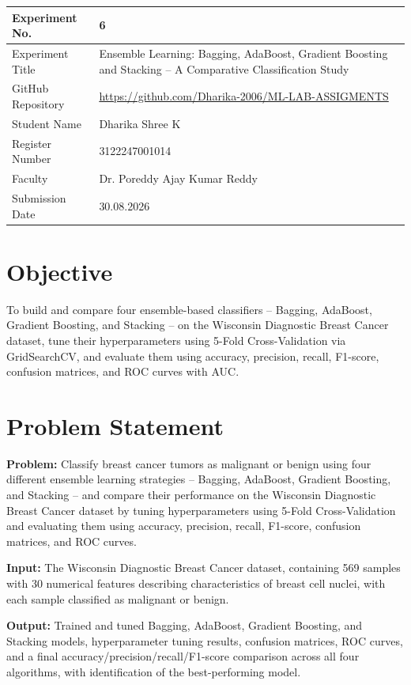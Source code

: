 \documentclass[12pt,a4paper]{article}
\begin{document}
\begin{tabular}{|p{4cm}|p{11cm}|}
\hline
Experiment No. & 6\\ \hline
Experiment Title & Ensemble Learning: Bagging, AdaBoost, Gradient Boosting and Stacking -- A Comparative Classification Study\\ \hline
GitHub Repository & \url{https://github.com/Dharika-2006/ML-LAB-ASSIGMENTS} \\ \hline
Student Name & Dharika Shree K\\ \hline
Register Number & 3122247001014\\ \hline
Faculty & Dr. Poreddy Ajay Kumar Reddy \\ \hline
Submission Date & 30.08.2026\\ \hline
\end{tabular}
\section{Objective}
To build and compare four ensemble-based classifiers -- Bagging, AdaBoost, Gradient Boosting, and Stacking -- on the Wisconsin Diagnostic Breast Cancer dataset, tune their hyperparameters using 5-Fold Cross-Validation via GridSearchCV, and evaluate them using accuracy, precision, recall, F1-score, confusion matrices, and ROC curves with AUC.

\section{Problem Statement}
\textbf{Problem:} Classify breast cancer tumors as malignant or benign using four different ensemble learning strategies -- Bagging, AdaBoost, Gradient Boosting, and Stacking -- and compare their performance on the Wisconsin Diagnostic Breast Cancer dataset by tuning hyperparameters using 5-Fold Cross-Validation and evaluating them using accuracy, precision, recall, F1-score, confusion matrices, and ROC curves.

\textbf{Input:} The Wisconsin Diagnostic Breast Cancer dataset, containing 569 samples with 30 numerical features describing characteristics of breast cell nuclei, with each sample classified as malignant or benign.

\textbf{Output:} Trained and tuned Bagging, AdaBoost, Gradient Boosting, and Stacking models, hyperparameter tuning results, confusion matrices, ROC curves, and a final accuracy/precision/recall/F1-score comparison across all four algorithms, with identification of the best-performing model.
\end{document}
